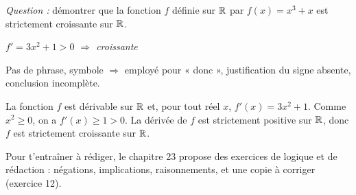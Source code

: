\vspace{7mm}
{\fontsize{10}{13.5}\selectfont
\emph{Question :} démontrer que la fonction $f$ définie sur $\mathbb{R}$ par $f(x)=x^{3}+x$ est strictement croissante sur $\mathbb{R}$.\par}
\vspace{3mm}
\noindent
\begin{minipage}[t]{0.42\linewidth}\vspace{0pt}
\begin{tcolorbox}[enhanced,colback=otOrange!10,colframe=otOrange!10,boxrule=0pt,arc=2mm,left=4mm,right=4mm,top=3mm,bottom=3mm,
  fontupper=\fontsize{10}{13.5}\selectfont]
\par\vspace{2mm}
{\itshape $f'=3x^{2}+1>0$ $\Rightarrow$ croissante}\par\vspace{2mm}
{\fontsize{8.6}{11.5}\selectfont\color{otMuted}Pas de phrase, symbole $\Rightarrow$ employé pour « donc », justification du signe
absente, conclusion incomplète.\par}
\end{tcolorbox}
\end{minipage}\hfill
\begin{minipage}[t]{0.54\linewidth}\vspace{0pt}
\begin{tcolorbox}[enhanced,colback=otGreenTint,colframe=otGreenTint,boxrule=0pt,arc=2mm,left=4mm,right=4mm,top=3mm,bottom=3mm,
  fontupper=\fontsize{10}{13.5}\selectfont]
\par\vspace{2mm}
La fonction $f$ est dérivable sur $\mathbb{R}$ et, pour tout réel $x$, $f'(x)=3x^{2}+1$. Comme $x^{2}\geq0$, on a $f'(x)\geq1>0$. La
dérivée de $f$ est strictement positive sur $\mathbb{R}$, donc $f$ est strictement croissante sur $\mathbb{R}$.
\end{tcolorbox}
\end{minipage}

\vspace{6mm}
{\fontsize{10}{13.5}\selectfont\color{otMuted}
Pour t'entraîner à rédiger, le chapitre 23 propose des exercices de logique et de rédaction : négations, implications,
raisonnements, et une copie à corriger (exercice 12).\par}
\clearpage

\thispagestyle{otFront}
\label{grille-langue}%

